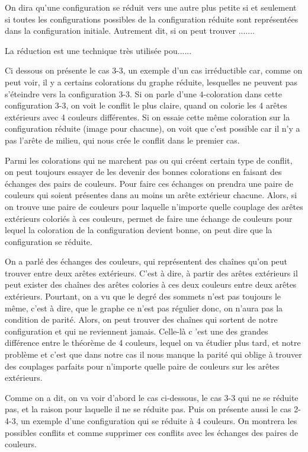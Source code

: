 \documentclass[10pt,a4paper]{article}
\begin{document}
On dira qu'une configuration se réduit vers une autre plus petite si et seulement si toutes les configurations possibles de la configuration réduite sont représentées dans la configuration initiale. Autrement dit, si on peut trouver .......

La réduction est une technique très utilisée pou...... 

Ci dessous on présente le cas 3-3, un exemple d'un cas irréductible car, comme on peut voir, il y a certains colorations du graphe réduite, lesquelles ne peuvent pas s'éteindre vers la configuration 3-3. Si on parle d'une $4$-coloration dans cette configuration 3-3, on voit le conflit le plus claire, quand on colorie les 4 arêtes extérieurs avec 4 couleurs différentes. Si on essaie cette même coloration sur la configuration réduite (image pour chacune), on voit que c'est possible car il n'y a pas l'arête de milieu, qui nous crée le conflit dans le premier cas. 

Parmi les colorations qui ne marchent pas ou qui créent certain type de conflit, on peut toujours essayer de les devenir des bonnes colorations en faisant des échanges des pairs de couleurs. Pour faire ces échanges on prendra une paire de couleurs qui soient présentes dans au moins un arête extérieur chacune. Alors, si on trouve une paire de couleurs pour laquelle n'importe quelle couplage des arêtes extérieurs coloriés à ces couleurs, permet de faire une échange de couleurs pour lequel la coloration de la configuration devient bonne, on peut dire que la configuration se réduite.

On a parlé des échanges des couleurs, qui représentent des chaînes qu'on peut trouver entre deux arêtes extérieurs. C'est à dire, à partir des arêtes extérieurs il peut exister des chaînes des arêtes colories à ces deux couleurs entre deux arêtes extérieurs. Pourtant, on a vu que le degré des sommets n'est pas toujours le même, c'est à dire, que le graphe ce n'est pas régulier donc, on n'aura pas la condition de parité. Alors, on peut trouver des chaînes qui sortent de notre configuration et qui ne reviennent jamais. Celle-là c 'est une des grandes différence entre le théorème de 4 couleurs, lequel on va étudier plus tard, et notre problème et c'est que dans notre cas il nous manque la parité qui oblige à trouver des couplages parfaits pour n'importe quelle paire de couleurs sur les arêtes extérieurs.

Comme on a dit, on va voir d'abord le cas ci-dessous, le cas 3-3 qui ne se réduite pas, et la raison pour laquelle il ne se réduite pas. Puis on présente aussi le cas 2-4-3, un exemple d'une configuration qui se réduite à 4 couleurs. On montrera les possibles conflits et comme supprimer ces conflits avec les échanges des paires de couleurs. 
\end{document}
